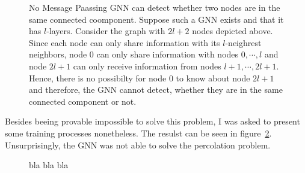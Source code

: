 \begin{figure}
    \centering
    \caption{No Message Paassing GNN can detect whether two nodes are in the same connected coomponent. 
    Suppose such a GNN exists and that it has $l$-layers. Consider the graph with $2l+2$ nodes depicted above. 
    Since each node can only share information with its $l$-neighrest neighbors, 
    node 0 can only share information with nodes $0,\cdots,l$
    and node $2l+1$ can only receive information from nodes $l+1,\cdots,2l+1$. 
    Hence, there is no possibilty for node $0$ to know about node $2l+1$ and 
    therefore, the GNN cannot detect, whether they are in the same connected component or not.}
    \label{fig:gnn_connectedComponent}
\end{figure}
Besides beeing provable impossible to solve this problem, I was asked to present some training processes nonetheless. 
The resulst can be seen in figure~\ref{fig:trainingPerc}. Unsurprisingly, the GNN was not able to solve the percolation problem.
\begin{figure}
    \centering
    \caption{bla bla bla}
    \label{fig:trainingPerc}
\end{figure}

